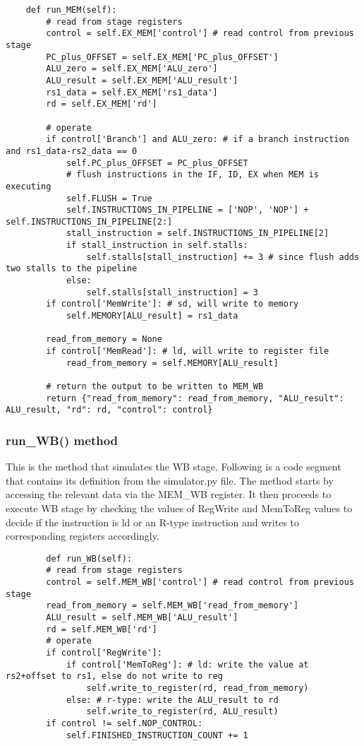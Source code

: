 \begin{lstlisting}
    def run_MEM(self):
        # read from stage registers
        control = self.EX_MEM['control'] # read control from previous stage
        PC_plus_OFFSET = self.EX_MEM['PC_plus_OFFSET']
        ALU_zero = self.EX_MEM['ALU_zero']
        ALU_result = self.EX_MEM['ALU_result']
        rs1_data = self.EX_MEM['rs1_data']
        rd = self.EX_MEM['rd']

        # operate
        if control['Branch'] and ALU_zero: # if a branch instruction and rs1_data-rs2_data == 0
            self.PC_plus_OFFSET = PC_plus_OFFSET
            # flush instructions in the IF, ID, EX when MEM is executing
            self.FLUSH = True
            self.INSTRUCTIONS_IN_PIPELINE = ['NOP', 'NOP'] + self.INSTRUCTIONS_IN_PIPELINE[2:]
            stall_instruction = self.INSTRUCTIONS_IN_PIPELINE[2]
            if stall_instruction in self.stalls:
                self.stalls[stall_instruction] += 3 # since flush adds two stalls to the pipeline
            else:
                self.stalls[stall_instruction] = 3
        if control['MemWrite']: # sd, will write to memory
            self.MEMORY[ALU_result] = rs1_data

        read_from_memory = None
        if control['MemRead']: # ld, will write to register file
            read_from_memory = self.MEMORY[ALU_result]
        
        # return the output to be written to MEM_WB
        return {"read_from_memory": read_from_memory, "ALU_result": ALU_result, "rd": rd, "control": control}
\end{lstlisting}

\subsubsection{run\_WB() method}
This is the method that simulates the WB stage. Following is a code segment that contains its definition from the simulator.py file. The method starts by accessing the relevant data via the MEM\_WB register. It then proceeds to execute WB stage by checking the values of RegWrite and MemToReg values to decide if the instruction is ld or an R-type instruction and writes to corresponding registers accordingly.
\vspace{0.5 cm}
\begin{lstlisting}
        def run_WB(self):
        # read from stage registers
        control = self.MEM_WB['control'] # read control from previous stage
        read_from_memory = self.MEM_WB['read_from_memory']
        ALU_result = self.MEM_WB['ALU_result']
        rd = self.MEM_WB['rd']
        # operate
        if control['RegWrite']:
            if control['MemToReg']: # ld: write the value at rs2+offset to rs1, else do not write to reg
                self.write_to_register(rd, read_from_memory)
            else: # r-type: write the ALU_result to rd
                self.write_to_register(rd, ALU_result)
        if control != self.NOP_CONTROL:
            self.FINISHED_INSTRUCTION_COUNT += 1
\end{lstlisting}

